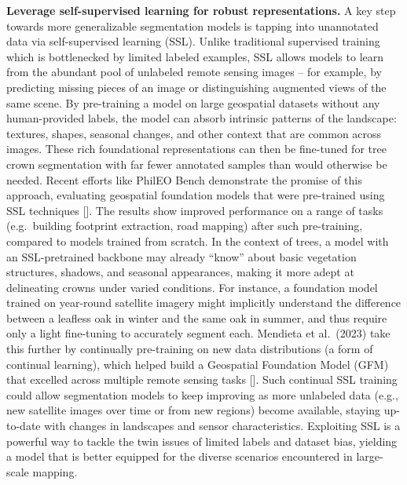 \documentclass[runningheads]{llncs}
\begin{document}
\textbf{Leverage self-supervised learning for robust representations.} A
key step towards more generalizable segmentation models is tapping into
unannotated data via self-supervised learning (SSL). Unlike traditional
supervised training which is bottlenecked by limited labeled examples,
SSL allows models to learn from the abundant pool of unlabeled remote
sensing images -- for example, by predicting missing pieces of an image
or distinguishing augmented views of the same scene. By pre-training a
model on large geospatial datasets without any human-provided labels,
the model can absorb intrinsic patterns of the landscape: textures,
shapes, seasonal changes, and other context that are common across
images. These rich foundational representations can then be fine-tuned
for tree crown segmentation with far fewer annotated samples than would
otherwise be needed. Recent efforts like PhilEO Bench demonstrate the
promise of this approach, evaluating geospatial foundation models that
were pre-trained using SSL techniques {[}\cite{fibaek2024phileo}{]}. The
results show improved performance on a range of tasks (e.g.~building
footprint extraction, road mapping) after such pre-training, compared to
models trained from scratch. In the context of trees, a model with an
SSL-pretrained backbone may already ``know'' about basic vegetation
structures, shadows, and seasonal appearances, making it more adept at
delineating crowns under varied conditions. For instance, a foundation
model trained on year-round satellite imagery might implicitly
understand the difference between a leafless oak in winter and the same
oak in summer, and thus require only a light fine-tuning to accurately
segment each. Mendieta et al.~(2023) take this further by continually
pre-training on new data distributions (a form of continual learning),
which helped build a Geospatial Foundation Model (GFM) that excelled
across multiple remote sensing tasks {[}\cite{mendieta2023gfm}{]}. Such
continual SSL training could allow segmentation models to keep improving
as more unlabeled data (e.g., new satellite images over time or from new
regions) become available, staying up-to-date with changes in landscapes
and sensor characteristics. Exploiting SSL is a powerful way to tackle
the twin issues of limited labels and dataset bias, yielding a model
that is better equipped for the diverse scenarios encountered in
large-scale mapping.
\end{document}
